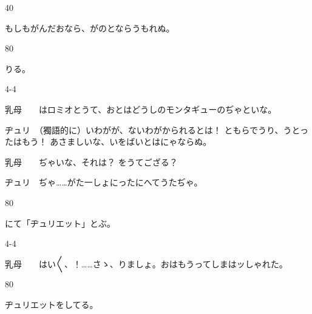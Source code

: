 \documentclass[tate,paper=b6j,jafontsize=9pt]{jlreq}
\begin{document}
\begin{azconvIndented}{4\zw}{0\zw}

もしもがんだおなら、がのとならうもれぬ。

\end{azconvIndented}
\begin{azconvIndented}{8\zw}{0\zw}

りる。

\end{azconvIndented}
\begin{azconvIndented}{4\zw}{-4\zw}

乳母　　はロミオとうて、おとはどうしのモンタギューのぢゃといな。

ヂュリ　（獨語的に）いわがが、ないわがかられるとは！ ともらでうり、うとったはもう！ あさましいな、いをばいとはにゃならぬ。

乳母　　ぢゃいな、それは？ をうてござる？

ヂュリ　ぢゃ……がた一しょにったにへてうたぢゃ。

\end{azconvIndented}
\begin{azconvIndented}{8\zw}{0\zw}

にて「ヂュリエット」とぶ。

\end{azconvIndented}
\begin{azconvIndented}{4\zw}{-4\zw}

乳母　　はい{〳〵}、！……さゝ、りましょ。おはもうってしまはッしゃれた。

\end{azconvIndented}
\begin{azconvIndented}{8\zw}{0\zw}

ヂュリエットをしてる。

\end{azconvIndented}
\end{document}
